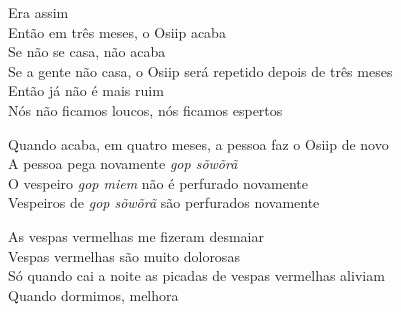  \noindent Era assim\\
 Então em três meses, o Osiip acaba\\
 Se não se casa, não acaba\\
 Se a gente não casa, o Osiip será repetido depois de três meses\\
 Então já não é mais ruim\\
 Nós não ficamos loucos, nós ficamos espertos
 
 \smallskip
 \begin{center}\end{center}
 \smallskip
 
\noindent  Quando acaba, em quatro meses, a pessoa faz o Osiip de novo\\
 A pessoa pega novamente \textit{gop sõwõrã}\\
 O vespeiro \textit{gop miem} não é perfurado novamente\\
 Vespeiros de \textit{gop sõwõrã} são perfurados novamente
 
 \smallskip
 \begin{center}\end{center}
 \smallskip
 
\noindent  As vespas vermelhas me fizeram desmaiar\\
 Vespas vermelhas são muito dolorosas\\
 Só quando cai a noite as picadas de vespas vermelhas aliviam\\
 Quando dormimos, melhora
 
